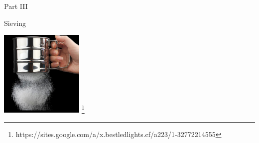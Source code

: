 \documentclass[usenames,dvipsnames, 9pt, aspectratio=169]{beamer}
\newcommand\blfootnote[1]{%
	\begingroup
	\renewcommand\footnoterule{}
	\renewcommand\thefootnote{}\footnote{#1}%
	\addtocounter{footnote}{-1}%
	\endgroup
}
\begin{document}
\begin{frame}
	\renewcommand\footnoterule{}
	Part III \\ [10pt]
	\begin{center}
		\color{Orange} \Huge{Sieving}
		
		\vspace{20pt}
		
		\includegraphics[width=4.0cm]{siever.jpg}
		\blfootnote{{\color{gray}https://sites.google.com/a/x.bestledlights.cf/a223/1-32772214555}}
	\end{center}
	
\end{frame}

\end{document}
